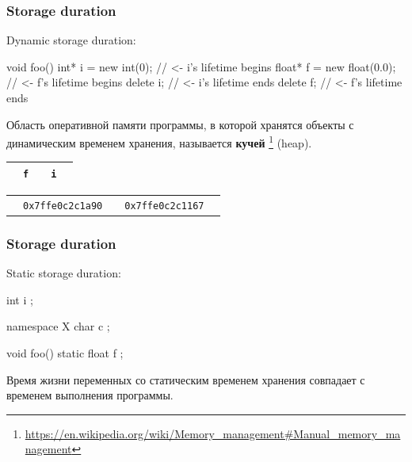 \documentclass[compress, 8pt, aspectratio=169]{beamer}
\begin{document}
\begin{frame}[fragile]

    \frametitle{Storage duration}

    Dynamic storage duration:

    \begin{myinplacelisting}[minted language=cpp]
void foo() {
    int* i = new int(0);        // <- i's lifetime begins
    float* f = new float(0.0);  // <- f's lifetime begins
    delete i;                   // <- i's lifetime ends
    delete f;                   // <- f's lifetime ends
}
    \end{myinplacelisting}

    Область оперативной памяти программы, в которой хранятся объекты
    с динамическим временем хранения, называется \textbf{кучей}
    \footnote{\url{https://en.wikipedia.org/wiki/Memory\_management\#Manual\_memory\_management}}
    (heap).

    \hfill \break
    \centering

    \begin{tabular}{|m{2cm}|m{10mm}|m{1cm}|m{5mm}|m{1.5cm}|}
        \hline
        \hfill &
        \cellcolor{red!10} \verb|f| &
        \hfill &
        \cellcolor{green!10} \verb|i| &
        \hfill \\
        \hline
    \end{tabular}
    \begin{tabular}{m{2cm}m{10mm}m{1cm}m{5mm}m{1.5cm}}
        \hfill &
        \verb|0x7ffe0c2c1a90| &
        \hfill &
        \verb|0x7ffe0c2c1167| &
        \hfill \\
    \end{tabular}

\end{frame}

\begin{frame}[fragile]

    \frametitle{Storage duration}

    Static storage duration:

    \begin{myinplacelisting}[minted language=cpp]
int i {};

namespace X {
    char c {};
}

void foo() {
    static float f {};
}
    \end{myinplacelisting}

    Время жизни переменных со статическим временем хранения
    совпадает с временем выполнения программы.

\end{frame}
\end{document}
